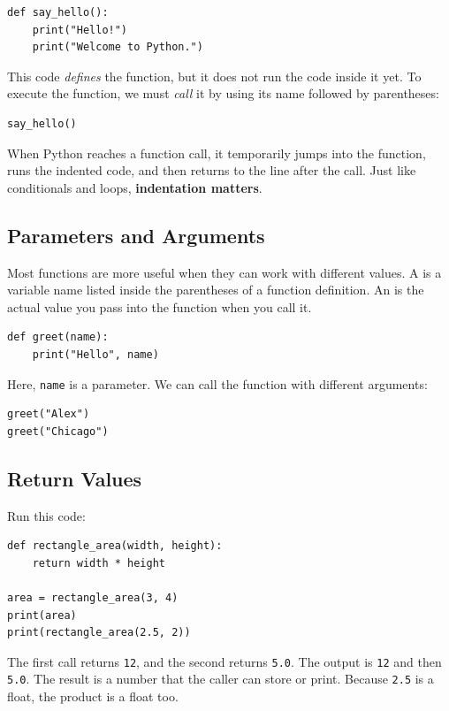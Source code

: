 \begin{verbatim}
def say_hello():
    print("Hello!")
    print("Welcome to Python.")
\end{verbatim}

This code \emph{defines} the function, but it does not run the code inside it yet.
To execute the function, we must \emph{call} it by using its name followed by parentheses:

\begin{verbatim}
say_hello()
\end{verbatim}

When Python reaches a function call, it temporarily jumps into the function, runs the
indented code, and then returns to the line after the call. Just like conditionals and loops,
\textbf{indentation matters}.

\subsection{Parameters and Arguments}
Most functions are more useful when they can work with different values.
A  is a variable name listed inside the parentheses of a function definition.
An  is the actual value you pass into the function when you call it.

\begin{verbatim}
def greet(name):
    print("Hello", name)
\end{verbatim}

Here, \texttt{name} is a parameter. We can call the function with different arguments:

\begin{verbatim}
greet("Alex")
greet("Chicago")
\end{verbatim}

\subsection{Return Values}
\begin{Worked}
\begin{Problem}
Run this code:
\begin{verbatim}
def rectangle_area(width, height):
    return width * height

area = rectangle_area(3, 4)
print(area)
print(rectangle_area(2.5, 2))
\end{verbatim}
\end{Problem}
\begin{Solution}
The first call returns \texttt{12}, and the second returns \texttt{5.0}. The output is \texttt{12} and then \texttt{5.0}. The result is a number that the caller can store or print. Because \texttt{2.5} is a float, the product is a float too.
\end{Solution}
\end{Worked}

